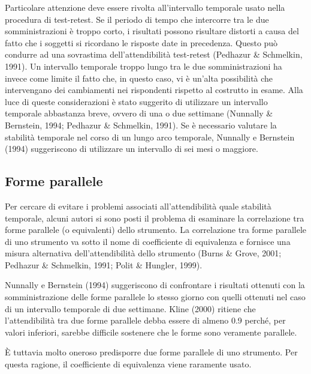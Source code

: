 Particolare attenzione deve essere rivolta all'intervallo temporale usato nella procedura di test-retest. Se il periodo di tempo che intercorre tra le due somministrazioni è troppo corto, i risultati possono risultare distorti a causa del fatto che i soggetti si ricordano le risposte date in precedenza. Questo può condurre ad una sovrastima dell'attendibilità test-retest (Pedhazur \& Schmelkin, 1991). Un intervallo temporale troppo lungo tra le due somministrazioni ha invece come limite il fatto che, in questo caso, vi è un'alta possibilità che intervengano dei cambiamenti nei rispondenti rispetto al costrutto in esame. Alla luce di queste considerazioni è stato suggerito di utilizzare un intervallo temporale abbastanza breve, ovvero di una o due settimane (Nunnally \& Bernstein, 1994; Pedhazur \& Schmelkin, 1991). Se è necessario valutare la stabilità temporale nel corso di un lungo arco temporale, Nunnally e
Bernstein (1994) suggeriscono di utilizzare un intervallo di sei mesi o maggiore.

\subsection{Forme parallele}

Per cercare di evitare i problemi associati all'attendibilità quale stabilità temporale, alcuni autori si sono posti il problema di esaminare la correlazione tra forme parallele (o equivalenti) dello strumento. La correlazione tra forme parallele di uno strumento va sotto il nome di coefficiente di equivalenza e fornisce una misura alternativa dell'attendibilità dello strumento (Burns \& Grove, 2001; Pedhazur \& Schmelkin, 1991; Polit \& Hungler, 1999).  

Nunnally e Bernstein (1994) suggeriscono di confrontare i risultati ottenuti con la somministrazione delle forme parallele lo stesso giorno con quelli ottenuti nel caso di un intervallo temporale di due settimane. Kline (2000) ritiene che l'attendibilità tra due forme parallele debba essere di almeno 0.9 perché, per valori inferiori, sarebbe difficile sostenere che le forme sono veramente parallele.

È tuttavia molto oneroso predisporre due forme parallele di uno strumento.  Per questa ragione, il coefficiente di equivalenza viene raramente usato.

